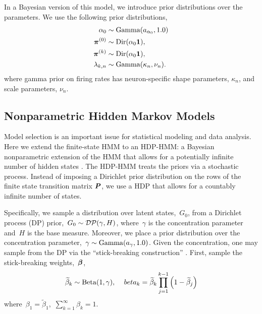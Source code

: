 
In a Bayesian version of this model,  we introduce prior distributions over
the parameters. We use the following prior distributions,
\begin{align*}
  \alpha_0 &\sim \mathrm{Gamma}(a_{\alpha_0}, 1.0) \\
  \boldsymbol{\pi}^{(0)} &\sim \mathrm{Dir}(\alpha_0\boldsymbol{1}),\\
  \boldsymbol{\pi}^{(k)} &\sim \mathrm{Dir}(\alpha_0\boldsymbol{1}), \\
  \lambda_{k,n} &\sim \mathrm{Gamma}(\kappa_n,\nu_n).
\end{align*}
where gamma prior on firing rates has neuron-specific shape parameters,
$\kappa_n$, and scale parameters, $\nu_n$.

\subsection{Nonparametric Hidden Markov Models}

Model selection is an important issue for statistical modeling and
data analysis.  Here we extend the finite-state HMM to an
HDP-HMM: a Bayesian nonparametric extension of the HMM that allows for
a potentially infinite number of hidden states \citep{Teh06,
  Beal02}. The HDP-HMM treats the priors via a stochastic
process. Instead of imposing a Dirichlet prior distribution on the
rows of the finite state transition matrix $\boldsymbol{P}$, we use a HDP that
allows for a countably infinite number of states.

Specifically, we sample a distribution over latent states,~$G_0$, from
a Dirichlet process (DP) \citep{Ferguson73}
prior,~${G_0\sim \mathcal{DP}(\gamma,H)}$, where~$\gamma$ is the
concentration parameter and~$H$ is the base measure.  Moreover, we
place a prior distribution over the concentration parameter,~$\gamma
\sim \mathrm{Gamma}(a_{\gamma}, 1.0)$.  Given the concentration, one may
sample from the DP via the ``stick-breaking construction''
\citep{Sethuraman94}. First, sample the stick-breaking
weights,~$\boldsymbol{\beta}$,
\begin{eqnarray}                                   
\widetilde{\beta}_{k}\sim \mathrm{Beta}(1,\gamma), \;\;\; \
beta_{k}=\widetilde{\beta}_{k}\prod_{j=1}^{k-1}\Big(1-\widetilde{\beta}_{j}\Big)
\label{stick1}
\end{eqnarray}
where~$\beta_1 = \widetilde{\beta}_1$,~$\sum_{k=1}^\infty \beta_{k}=1$.

